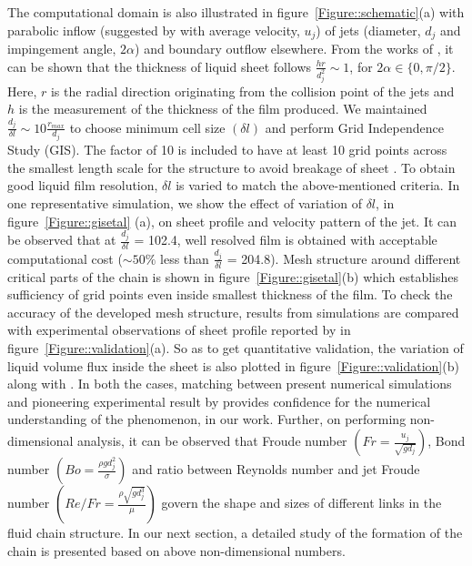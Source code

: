 \documentclass[%
 aip,
 sd,%
amsmath,amssymb,
preprint,%
author-year,%
]{revtex4-1}
\begin{document}
The computational domain is also illustrated in figure~\ref{Figure::schematic}(a) with parabolic inflow (suggested by \cite{choo2007effect} with average velocity, $u_j$) of jets (diameter, $d_j$ and impingement angle, $2\alpha$) and boundary outflow elsewhere. From the works of \cite{hasson1964thickness,choo2001parametric}, it can be shown that the thickness of liquid sheet follows $\frac{hr}{d_j^2} \sim 1$, for $2\alpha \in \{0,\pi/2\}$.  Here, $r$ is the radial direction originating from the collision point of the jets and $h$ is the measurement of the thickness of the film produced. We maintained $\frac{d_j}{\delta l} \sim 10\frac{r_{max}}{d_j}$ to choose minimum cell size $\left(\delta l\right)$ and perform Grid Independence Study (GIS). The factor of 10 is included to have at least 10 grid points \citep{ling2015multiscale} across the smallest length scale for the structure to avoid breakage of sheet \citep{chen2013high}. To obtain good liquid film resolution, $\delta l$ is varied to match the above-mentioned criteria. In one representative simulation, we show the effect of variation of $\delta l$, in figure~\ref{Figure::gisetal} (a), on sheet profile and velocity pattern of the jet. It can be observed that at $\frac{d_j}{\delta l}$ = 102.4, well resolved film is obtained with acceptable computational cost ($\sim 50\%$ less than $\frac{d_j}{\delta l}$ = 204.8). Mesh structure around different critical parts of the chain is shown in figure~\ref{Figure::gisetal}(b) which establishes sufficiency of grid points even inside smallest thickness of the film. To check the accuracy of the developed mesh structure, results from simulations are compared with experimental observations of sheet profile reported by \cite{bush2004collision} in figure~\ref{Figure::validation}(a). So as to get quantitative validation, the variation of liquid volume flux inside the sheet is also plotted in figure~\ref{Figure::validation}(b) along with \cite{bush2004collision}. In both the cases, matching between present numerical simulations and pioneering experimental result by \cite{bush2004collision} provides confidence for the numerical understanding of the phenomenon, in our work. Further, on performing non-dimensional analysis, it can be observed that Froude number $\left(Fr = \frac{u_j}{\sqrt{gd_j}}\right)$, Bond number $\left(Bo = \frac{\rho gd_j^2}{\sigma}\right)$ and ratio between Reynolds number and jet Froude number $\left(Re/Fr = \frac{\rho\sqrt{gd_j^3}}{\mu}\right)$ govern the shape and sizes of different links in the fluid chain structure. In our next section, a detailed study of the formation of the chain is presented based on above non-dimensional numbers.
\end{document}
